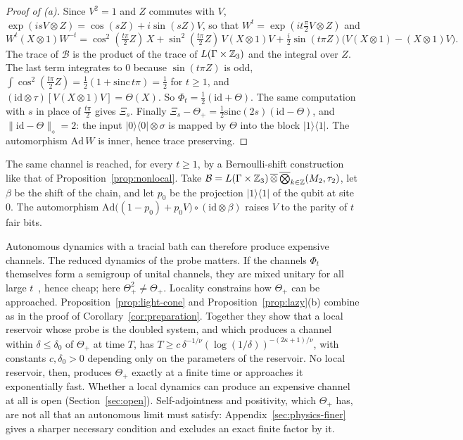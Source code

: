 \begin{proof}[Proof of (a)]
Since $V^2=1$ and $Z$ commutes with $V$, $\exp(isV\otimes Z)=\cos(sZ)+i\sin(sZ)V$, so that $W^t=\exp(it\frac\pi2V\otimes Z)$ and
\[
W^t(X\otimes1)W^{-t}=\cos^2(\tfrac{t\pi}2Z)\,X+\sin^2(\tfrac{t\pi}2Z)\,V(X\otimes1)V+\tfrac i2\sin(t\pi Z)\bigl(V(X\otimes1)-(X\otimes1)V\bigr).
\]
The trace of $\mathcal B$ is the product of the trace of $L(\Gamma\times\mathbb Z_3)$ and the integral over $Z$. The last term integrates to $0$ because
$\sin(t\pi Z)$ is odd, $\int\cos^2(\frac{t\pi}2Z)=\frac12(1+\mathrm{sinc}\,t\pi)=\frac12$ for $t\ge1$, and $(\mathrm{id}\otimes\tau)[V(X\otimes1)V]=\Theta(X)$.
So $\Phi_t=\frac12(\mathrm{id}+\Theta)$. The same computation with $s$ in place of $\frac{t\pi}2$ gives $\Xi_s$. Finally
$\Xi_s-\Theta_+=\frac12\mathrm{sinc}(2s)(\mathrm{id}-\Theta)$, and $\|\mathrm{id}-\Theta\|_\diamond=2$: the input $|0\rangle\langle0|\otimes\sigma$ is mapped
by $\Theta$ into the block $|1\rangle\langle1|$. The automorphism $\mathrm{Ad}\,W$ is inner, hence trace preserving.
\end{proof}

The same channel is reached, for every $t\ge1$, by a Bernoulli-shift construction like that of Proposition~\ref{prop:nonlocal}. Take
$\mathcal B=L(\Gamma\times\mathbb Z_3)\,\overline\otimes\,\overline\bigotimes_{k\in\mathbb Z}(M_2,\tau_2)$, let $\beta$ be the shift of the chain, and let $p_0$ be
the projection $|1\rangle\langle1|$ of the qubit at site $0$. The automorphism $\mathrm{Ad}\bigl((1-p_0)+p_0V\bigr)\circ(\mathrm{id}\otimes\beta)$ raises
$V$ to the parity of $t$ fair bits.

Autonomous dynamics with a tracial bath can therefore produce expensive channels. The reduced dynamics of the probe matters. If the channels
$\Phi_t$ themselves form a semigroup of unital channels, they are mixed unitary for all large $t$~\cite{BhatDevendra2025}, hence cheap; here
$\Theta_+^2\ne\Theta_+$. Locality constrains how $\Theta_+$ can be approached. Proposition~\ref{prop:light-cone} and
Proposition~\ref{prop:lazy}(b) combine as in the proof of Corollary~\ref{cor:preparation}. Together they show that a local reservoir whose
probe is the doubled system, and which produces a channel within $\delta\le\delta_0$ of $\Theta_+$ at time $T$, has
$T\ge c\,\delta^{-1/\nu}(\log(1/\delta))^{-(2\kappa+1)/\nu}$, with constants $c,\delta_0>0$ depending only on the parameters of the reservoir. No
local reservoir, then, produces $\Theta_+$ exactly at a finite time or approaches it exponentially fast. Whether a local dynamics can produce an
expensive channel at all is open (Section~\ref{sec:open}). Self-adjointness and positivity, which $\Theta_+$ has, are not all that an
autonomous limit must satisfy: Appendix~\ref{sec:physics-finer} gives a sharper necessary condition and excludes an exact finite
factor by it.
